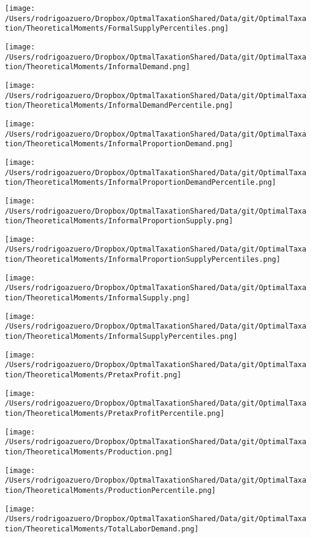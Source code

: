 \documentclass[12pt]{article}
\begin{document}
\texttt{[image: /Users/rodrigoazuero/Dropbox/OptmalTaxationShared/Data/git/OptimalTaxation/TheoreticalMoments/FormalSupplyPercentiles.png]}

\texttt{[image: /Users/rodrigoazuero/Dropbox/OptmalTaxationShared/Data/git/OptimalTaxation/TheoreticalMoments/InformalDemand.png]}

\texttt{[image: /Users/rodrigoazuero/Dropbox/OptmalTaxationShared/Data/git/OptimalTaxation/TheoreticalMoments/InformalDemandPercentile.png]}

\texttt{[image: /Users/rodrigoazuero/Dropbox/OptmalTaxationShared/Data/git/OptimalTaxation/TheoreticalMoments/InformalProportionDemand.png]}

\texttt{[image: /Users/rodrigoazuero/Dropbox/OptmalTaxationShared/Data/git/OptimalTaxation/TheoreticalMoments/InformalProportionDemandPercentile.png]}

\texttt{[image: /Users/rodrigoazuero/Dropbox/OptmalTaxationShared/Data/git/OptimalTaxation/TheoreticalMoments/InformalProportionSupply.png]}

\texttt{[image: /Users/rodrigoazuero/Dropbox/OptmalTaxationShared/Data/git/OptimalTaxation/TheoreticalMoments/InformalProportionSupplyPercentiles.png]}

\texttt{[image: /Users/rodrigoazuero/Dropbox/OptmalTaxationShared/Data/git/OptimalTaxation/TheoreticalMoments/InformalSupply.png]}

\texttt{[image: /Users/rodrigoazuero/Dropbox/OptmalTaxationShared/Data/git/OptimalTaxation/TheoreticalMoments/InformalSupplyPercentiles.png]}

\texttt{[image: /Users/rodrigoazuero/Dropbox/OptmalTaxationShared/Data/git/OptimalTaxation/TheoreticalMoments/PretaxProfit.png]}

\texttt{[image: /Users/rodrigoazuero/Dropbox/OptmalTaxationShared/Data/git/OptimalTaxation/TheoreticalMoments/PretaxProfitPercentile.png]}

\texttt{[image: /Users/rodrigoazuero/Dropbox/OptmalTaxationShared/Data/git/OptimalTaxation/TheoreticalMoments/Production.png]}

\texttt{[image: /Users/rodrigoazuero/Dropbox/OptmalTaxationShared/Data/git/OptimalTaxation/TheoreticalMoments/ProductionPercentile.png]}

\texttt{[image: /Users/rodrigoazuero/Dropbox/OptmalTaxationShared/Data/git/OptimalTaxation/TheoreticalMoments/TotalLaborDemand.png]}
\end{document}
